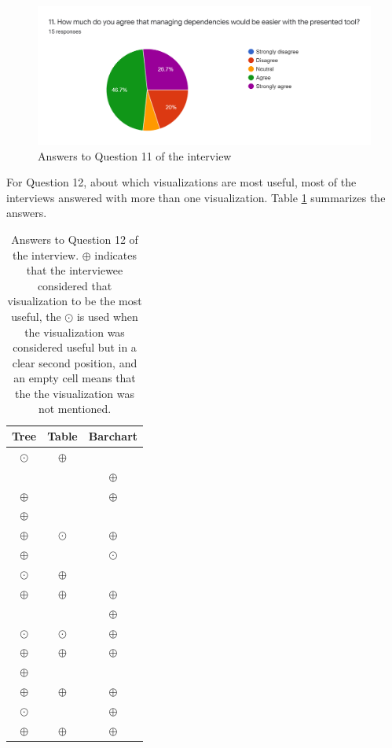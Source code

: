 \begin{figure}[ht!]
\begin{center}
\includegraphics[width=\textwidth]{figures/interview/Question11.png}
\caption{Answers to Question 11 of the interview}
\label{fig:interview-11}
\end{center}
\end{figure}

For Question 12, about which visualizations are most useful, most of the interviews answered with more than one visualization. Table \ref{table:interview-12} summarizes the answers.

\begin{table}[ht!]
    \begin{center}
    \begin{tabular}{|c|c|c|}
    \hline
    Tree      & Table     & Barchart \\
    \hline\hline
    $\odot$   & $\oplus$  & ~        \\\hline
    ~	        & ~	        & $\oplus$ \\\hline
    $\oplus$  & ~         & $\oplus$ \\\hline
    $\oplus$	& ~         & ~        \\\hline
    $\oplus$	& $\odot$	  & $\oplus$ \\\hline
    $\oplus$	& ~         & $\odot$  \\\hline
    $\odot$	  & $\oplus$	& ~        \\\hline
    $\oplus$	& $\oplus$	& $\oplus$ \\\hline
    ~	        & ~	        & $\oplus$ \\\hline
    $\odot$	  & $\odot$	  & $\oplus$ \\\hline
    $\oplus$	& $\oplus$	& $\oplus$ \\\hline
    $\oplus$	& ~	        & ~        \\\hline
    $\oplus$	& $\oplus$	& $\oplus$ \\\hline
    $\odot$	  & ~	        & $\oplus$ \\\hline
    $\oplus$	& $\oplus$	& $\oplus$ \\\hline
    \end{tabular}
    \end{center}
    \caption{Answers to Question 12 of the interview. $\oplus$ indicates that the interviewee considered that visualization to be the most useful, the $\odot$ is used when the visualization was considered useful but in a clear second position, and an empty cell means that the the visualization was not mentioned.}
    \label{table:interview-12}
\end{table}

